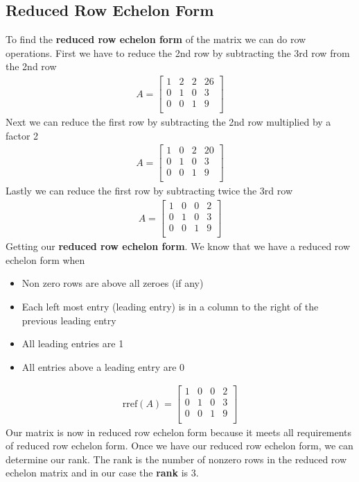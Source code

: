 \documentclass[12pt]{article}
\begin{document}
\subsection{Reduced Row Echelon Form}
To find the \textbf{reduced row echelon form} of the matrix we can do row operations.
First we have to reduce the 2nd row by subtracting the 3rd row from the 2nd row
\begin{align*}
A = \begin{bmatrix}
 1 & 2 & 2 & 26 \\
  0 & 1 & 0 & 3 \\
 0 & 0 & 1 & 9 \\
 \end{bmatrix}
\end{align*}
Next we can reduce the first row by subtracting the 2nd row multiplied by a factor 2
\begin{align*}
A = \begin{bmatrix}
 1 & 0 & 2 & 20 \\
  0 & 1 & 0 & 3 \\
 0 & 0 & 1 & 9 \\
 \end{bmatrix}
\end{align*}
Lastly we can reduce the first row by subtracting twice the 3rd row
\begin{align*}
A = \begin{bmatrix}
 1 & 0 & 0 & 2 \\
  0 & 1 & 0 & 3 \\
 0 & 0 & 1 & 9 \\
 \end{bmatrix}
\end{align*}
Getting our \textbf{reduced row echelon form}. We know that we have a reduced row echelon form when 
\begin{itemize}
  \item Non zero rows are above all zeroes (if any)
  \item Each left most entry (leading entry) is in a column to the right of the previous leading entry
  \item All leading entries are 1
   \item All entries above a leading entry are 0
\end{itemize}
\begin{align*}
\text{rref}(A) = \begin{bmatrix}
 1 & 0 & 0 & 2 \\
  0 & 1 & 0 & 3 \\
 0 & 0 & 1 & 9 \\
 \end{bmatrix}
\end{align*}
Our matrix is now in reduced row echelon form because it meets all requirements of reduced row echelon form.
Once we have our reduced row echelon form, we can determine our rank. The rank is the number of nonzero rows in the reduced row echelon matrix and in our case the \textbf{rank} is 3.
\newline
\end{document}
